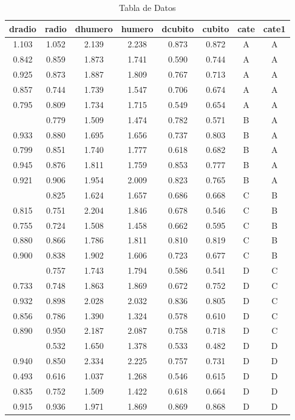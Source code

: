 \documentclass[12pt,a4paper,]{book}
\numberwithin{dummy}{section}
\theoremstyle{ocrenumbox}
\theoremstyle{ocrenumbox}
\theoremstyle{ocrenumbox}
\theoremstyle{ocrenumbox}
\theoremstyle{ocrenum}
\begin{document}
\begin{longtable}[t]{cccccccc}
\caption{\label{tab:unnamed-chunk-15}Tabla de Datos}\\
\toprule
dradio & radio & dhumero & humero & dcubito & cubito & cate & cate1\\
\midrule
1.103 & 1.052 & 2.139 & 2.238 & 0.873 & 0.872 & A & A\\
0.842 & 0.859 & 1.873 & 1.741 & 0.590 & 0.744 & A & A\\
0.925 & 0.873 & 1.887 & 1.809 & 0.767 & 0.713 & A & A\\
0.857 & 0.744 & 1.739 & 1.547 & 0.706 & 0.674 & A & A\\
0.795 & 0.809 & 1.734 & 1.715 & 0.549 & 0.654 & A & A\\
\addlinespace
0.787 & 0.779 & 1.509 & 1.474 & 0.782 & 0.571 & B & A\\
0.933 & 0.880 & 1.695 & 1.656 & 0.737 & 0.803 & B & A\\
0.799 & 0.851 & 1.740 & 1.777 & 0.618 & 0.682 & B & A\\
0.945 & 0.876 & 1.811 & 1.759 & 0.853 & 0.777 & B & A\\
0.921 & 0.906 & 1.954 & 2.009 & 0.823 & 0.765 & B & A\\
\addlinespace
0.792 & 0.825 & 1.624 & 1.657 & 0.686 & 0.668 & C & B\\
0.815 & 0.751 & 2.204 & 1.846 & 0.678 & 0.546 & C & B\\
0.755 & 0.724 & 1.508 & 1.458 & 0.662 & 0.595 & C & B\\
0.880 & 0.866 & 1.786 & 1.811 & 0.810 & 0.819 & C & B\\
0.900 & 0.838 & 1.902 & 1.606 & 0.723 & 0.677 & C & B\\
\addlinespace
0.764 & 0.757 & 1.743 & 1.794 & 0.586 & 0.541 & D & C\\
0.733 & 0.748 & 1.863 & 1.869 & 0.672 & 0.752 & D & C\\
0.932 & 0.898 & 2.028 & 2.032 & 0.836 & 0.805 & D & C\\
0.856 & 0.786 & 1.390 & 1.324 & 0.578 & 0.610 & D & C\\
0.890 & 0.950 & 2.187 & 2.087 & 0.758 & 0.718 & D & C\\
\addlinespace
0.688 & 0.532 & 1.650 & 1.378 & 0.533 & 0.482 & D & D\\
0.940 & 0.850 & 2.334 & 2.225 & 0.757 & 0.731 & D & D\\
0.493 & 0.616 & 1.037 & 1.268 & 0.546 & 0.615 & D & D\\
0.835 & 0.752 & 1.509 & 1.422 & 0.618 & 0.664 & D & D\\
0.915 & 0.936 & 1.971 & 1.869 & 0.869 & 0.868 & D & D\\
\bottomrule
\end{longtable}
\endgroup{}
\end{document}
